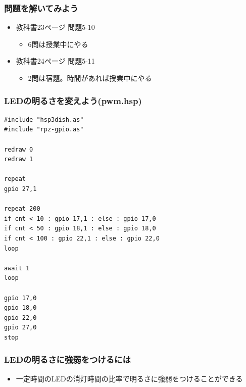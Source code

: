\begin{frame}[fragile]
    \frametitle{問題を解いてみよう}
    \begin{itemize}
        \item 教科書23ページ 問題5-10
        \begin{itemize}
            \item 6問は授業中にやる
        \end{itemize}
        \item 教科書24ページ 問題5-11
        \begin{itemize}
            \item 2問は宿題。時間があれば授業中にやる
        \end{itemize}
    \end{itemize}
\end{frame}

\begin{frame}[fragile]
    \frametitle{LEDの明るさを変えよう(pwm.hsp)}
\begin{lstlisting}
#include "hsp3dish.as"
#include "rpz-gpio.as"

redraw 0
redraw 1

repeat
gpio 27,1

repeat 200
if cnt < 10 : gpio 17,1 : else : gpio 17,0
if cnt < 50 : gpio 18,1 : else : gpio 18,0
if cnt < 100 : gpio 22,1 : else : gpio 22,0
loop

await 1
loop

gpio 17,0
gpio 18,0
gpio 22,0
gpio 27,0
stop
\end{lstlisting}
\end{frame}

\begin{frame}
    \frametitle{LEDの明るさに強弱をつけるには}
    \begin{center}
        \begin{figure}
            
        \end{figure}
        \begin{itemize}
            \item 一定時間のLEDの消灯時間の比率で明るさに強弱をつけることができる
        \end{itemize}
    \end{center}
\end{frame}